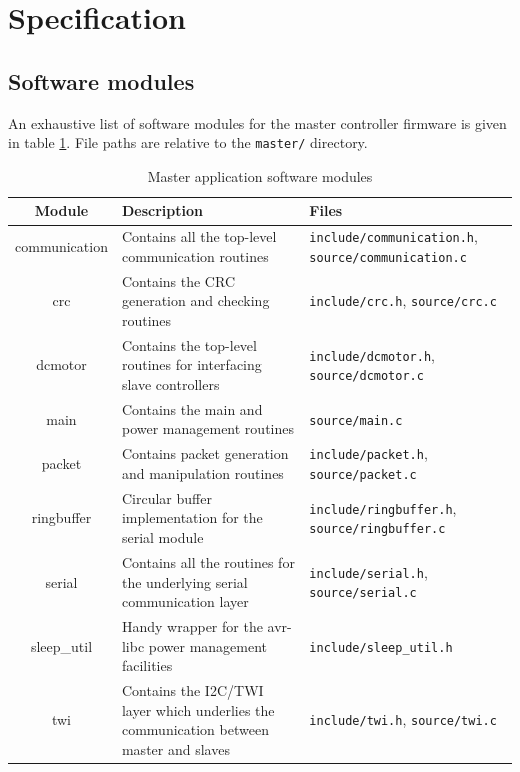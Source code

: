 \documentclass[binding=0.6cm,Lau]{sapthesis}
\begin{document}
\section{Specification}

\subsection{Software modules}
An exhaustive list of software modules for the master controller firmware is
given in table \ref{tab:master-spec-modules}. File paths are relative to the
\texttt{master/} directory.

\begin{table}[bh]
  \begin{tabularx}{\textwidth}{c X X}
    \toprule
    Module & Description & Files \\
    \midrule
    communication &
      Contains all the top-level communication routines &
      \texttt{include/communication.h}, \texttt{source/communication.c} \\
    crc &
      Contains the CRC generation and checking routines &
      \texttt{include/crc.h}, \texttt{source/crc.c} \\
    dcmotor &
      Contains the top-level routines for interfacing slave controllers &
      \texttt{include/dcmotor.h}, \texttt{source/dcmotor.c} \\
    main &
      Contains the main and power management routines &
      \texttt{source/main.c} \\
    packet &
      Contains packet generation and manipulation routines &
      \texttt{include/packet.h}, \texttt{source/packet.c} \\
    ringbuffer &
      Circular buffer implementation for the serial module &
      \texttt{include/ringbuffer.h}, \texttt{source/ringbuffer.c} \\
    serial &
      Contains all the routines for the underlying serial communication layer &
      \texttt{include/serial.h}, \texttt{source/serial.c} \\
    sleep\_util &
      Handy wrapper for the avr-libc power management facilities &
      \texttt{include/sleep\_util.h} \\
    twi &
      Contains the I2C/TWI layer which underlies the communication between master and slaves &
      \texttt{include/twi.h}, \texttt{source/twi.c} \\
    \bottomrule
  \end{tabularx}
  \caption{Master application software modules}
  \label{tab:master-spec-modules}
\end{table}
\end{document}

